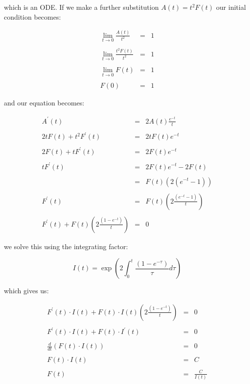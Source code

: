 which is an ODE. If we make a further substitution $A(t) = t^2 F(t)$ our initial condition becomes: \bigskip

\begin{eqnarray*}
		\lim_{t \to 0} \frac{A(t)}{t^2} & = & 1 \\\\
	\lim_{t \to 0} \frac{t^2 F(t)}{t^2} & = & 1 \\\\
					\lim_{t \to 0} F(t) & = & 1 \\\\
								   F(0) & = & 1 
\end{eqnarray*}\medskip

and our equation becomes: \bigskip

\begin{eqnarray*}
												   A^{\prime}(t) & = & 2 A(t) \frac{e^{-t}}{t} \\\\
									2 t F(t) + t^2 F^{\prime}(t) & = & 2 t F(t) e^{-t} \\\\
										2 F(t) + t F^{\prime}(t) & = & 2 F(t) e^{-t} \\\\
												 t F^{\prime}(t) & = & 2 F(t) e^{-t} - 2 F(t) \\\\
																 & = & F(t) \left( 2 ( e^{-t} - 1 ) \right) \\\\
							 					   F^{\prime}(t) & = & F(t) \left( 2 \frac{(e^{-t} - 1)}{t} \right) \\\\
	F^{\prime}(t) + F(t) \left( 2 \frac{(1 - e^{-t})}{t} \right) & = & 0 
\end{eqnarray*}\medskip

we solve this using the integrating factor: \bigskip

\[
	I(t) = \exp \left( 2 \int_{0}^{t} \frac{(1 - e^{-\tau})}{\tau} d\tau \right)
\]\medskip

which gives us: \bigskip

\begin{eqnarray*}
	F^{\prime}(t) \cdot I(t) + F(t) \cdot I(t) \left( 2 \frac{(1 - e^{-t})}{t} \right) & = & 0 \\\\
								   F^{\prime}(t) \cdot I(t) + F(t) \cdot I^{\prime}(t) & = & 0 \\\\
														\frac{d}{dt} (F(t) \cdot I(t)) & = & 0 \\\\
												  					   F(t) \cdot I(t) & = & C \\\\
												  								  F(t) & = & \frac{C}{I(t)}
\end{eqnarray*}\medskip

